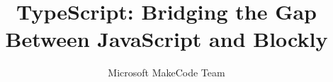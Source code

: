 \documentclass[sigplan,10pt]{acmart}
\begin{document}
\title{TypeScript: Bridging the Gap Between JavaScript and Blockly}         %
\subtitle{Microsoft MakeCode Team}                     %






% 
\end{document}
